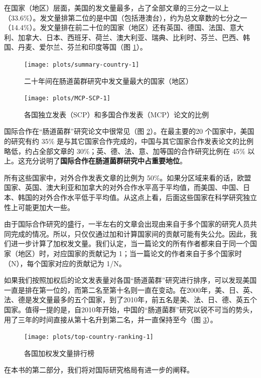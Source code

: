 \documentclass[]{ctexbook}
\begin{document}
在国家（地区）层面，美国的发文量最多，占了全部文章的三分之一以上（33.6\%）。发文量排第二位的是中国（包括港澳台），约为总文章数的七分之一（14.4\%）。发文量排在前二十位的国家（地区）还有英国、德国、法国、意大利、加拿大、日本、西班牙、荷兰、澳大利亚、瑞典、比利时、芬兰、巴西、韩国、丹麦、爱尔兰、芬兰和印度等国（图 \ref{fig:summary-country}）。

\begin{figure}
\texttt{[image: plots/summary-country-1]} \caption{二十年间在肠道菌群研究中发文量最大的国家（地区）}\label{fig:summary-country}
\end{figure}

\begin{figure}
\texttt{[image: plots/MCP-SCP-1]} \caption{各国独立发表（SCP）和多国合作发表（MCP）论文的比例}\label{fig:MCP-SCP}
\end{figure}

国际合作在``肠道菌群''研究论文中很常见（图 \ref{fig:MCP-SCP}）。在最主要的20 个国家中，美国的研究有约 35\% 是与其它国家合作完成的，中国与其它国家合作发表论文的比例略低，约占全部文章的 30\%；英、德、法、意、加等国的合作研究比例在 45\% 以上。这充分说明了\textbf{国际合作在肠道菌群研究中占重要地位}。

所有这些国家中，对外合作发表文章的比例为 50\%。如果分区域来看的话，欧盟国家、英国、澳大利亚和加拿大的对外合作水平高于平均值，而美国、中国、日本、韩国的对外合作水平低于平均值。从这点上看，后面这些国家在科学研究独立性上可能更加大一些。

由于国际合作研究的盛行，一半左右的文章会出现由来自于多个国家的研究人员共同完成的情况。所以，只仅仅通过加和计算国家间的贡献可能有失公允。因此，我们进一步计算了加权发文量。我们认定，当一篇论文的所有作者都来自于同一个国家（地区）时，对应国家的贡献记为 1；当一篇论文的作者来自于多个国家时（N），每个国家对应的贡献记为 1/N。

如果我们按照加权后的论文发表量对各国``肠道菌群''研究进行排序，可以发现美国一直是排在第一位的，而第二名至第十名则一直在变动。在2000年，美、日、英、法、德是发文量最多的五个国家，到了2010年，前五名是美、法、日、德、英五个国家。值得一提的是，自2010年开始，中国的``肠道菌群''研究以锐不可当的势头，用了三年的时间直接从第十名升到第二名，并一直保持至今（图 \ref{fig:top-country-ranking}）。

\begin{figure}
\texttt{[image: plots/top-country-ranking-1]} \caption{各国加权发文量排行榜}\label{fig:top-country-ranking}
\end{figure}

在本书的第二部分，我们将对国际研究格局有进一步的阐释。
\end{document}
